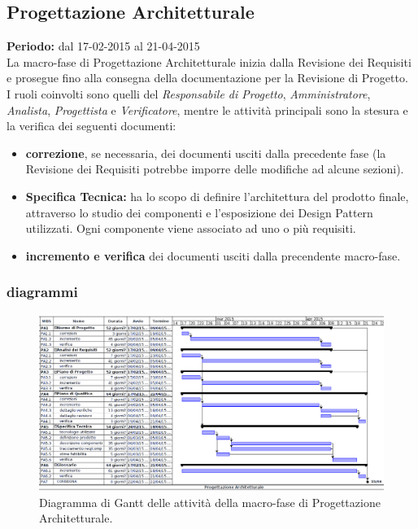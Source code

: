 \subsection{Progettazione Architetturale}
\textbf{Periodo:} dal 17-02-2015 al 21-04-2015 \\
La macro-fase di Progettazione Architetturale inizia dalla Revisione dei Requisiti e prosegue fino alla consegna della documentazione per la Revisione di Progetto. \\
I ruoli coinvolti sono quelli del \textit{Responsabile di Progetto}, \textit{Amministratore}, \textit{Analista}, \textit{Progettista} e \textit{Verificatore}, mentre le attività principali sono la stesura e la verifica dei seguenti documenti:

\begin{itemize}
\item \textbf{correzione}, se necessaria, dei documenti usciti dalla precedente fase (la Revisione dei Requisiti potrebbe imporre delle modifiche ad alcune sezioni).
\item \textbf{Specifica Tecnica:} ha lo scopo di definire l'architettura del prodotto finale,  attraverso lo studio dei componenti e l'esposizione dei Design Pattern utilizzati. Ogni componente viene associato ad uno o più requisiti.
\item \textbf{incremento e verifica} dei documenti usciti dalla precendente macro-fase.
\end{itemize}

\newpage
\subsubsection{diagrammi}

\begin{figure}[h]
\begin{center}
\includegraphics[width=\textwidth, height=\textheight, keepaspectratio]{img/progarc-gantt.png}
\caption{Diagramma di Gantt delle attività della macro-fase di Progettazione Architetturale.}
\end{center}
\end{figure}
\clearpage

